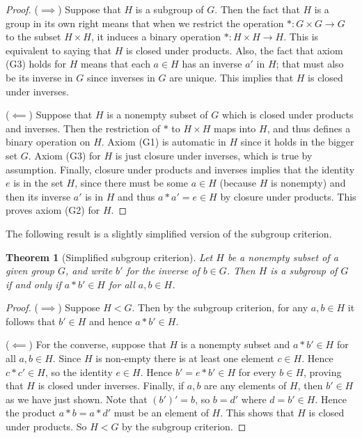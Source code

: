 \documentclass[11pt]{article}
\newtheorem{thm}{Theorem}[section]
\theoremstyle{definition}
\begin{document}
\begin{proof}
  ($\implies$) Suppose that $H$ is a subgroup of $G$. Then the fact
  that $H$ is a group in its own right means that when we restrict the
  operation $*\colon G \times G \to G$ to the subset $H \times H$, it
  induces a binary operation $*\colon H \times H \to H$. This is
  equivalent to saying that $H$ is closed under products. Also, the
  fact that axiom (G3) holds for $H$ means that each $a \in H$ has an
  inverse $a'$ in $H$; that must also be its inverse in $G$ since
  inverses in $G$ are unique.  This implies that $H$ is closed under
  inverses.

  ($\impliedby$) Suppose that $H$ is a nonempty subset of $G$ which is
  closed under products and inverses. Then the restriction of $*$ to
  $H \times H$ maps into $H$, and thus defines a binary operation on
  $H$. Axiom (G1) is automatic in $H$ since it holds in the bigger set
  $G$. Axiom (G3) for $H$ is just closure under inverses, which is
  true by assumption. Finally, closure under products and inverses
  implies that the identity $e$ is in the set $H$, since there must be
  some $a \in H$ (because $H$ is nonempty) and then its inverse $a'$
  is in $H$ and thus $a*a' = e \in H$ by closure under products. This
  proves axiom (G2) for $H$.
\end{proof}

The following result is a slightly simplified version of the subgroup
criterion. 


\begin{thm}[Simplified subgroup criterion]
  Let $H$ be a nonempty subset of a given group $G$, and write $b'$
  for the inverse of $b \in G$.  Then $H$ is a subgroup of $G$ if and
  only if $a*b' \in H$ for all $a,b \in H$.
\end{thm}

\begin{proof} 
($\implies$) Suppose $H<G$. Then by the subgroup criterion, for any
  $a,b \in H$ it follows that $b' \in H$ and hence $a*b' \in H$.

($\impliedby$) For the converse, suppose that $H$ is a nonempty
  subset and $a*b' \in H$ for all $a,b \in H$. Since $H$ is non-empty
  there is at least one element $c \in H$. Hence $c*c' \in H$, so the
  identity $e \in H$.  Hence $b' = e*b' \in H$ for every $b\in H$,
  proving that $H$ is closed under inverses. Finally, if $a,b$ are any
  elements of $H$, then $b'\in H$ as we have just shown. Note that
  $(b')' = b$, so $b = d'$ where $d = b' \in H$. Hence the product
  $a*b = a*d'$ must be an element of $H$. This shows that $H$ is
  closed under products. So $H<G$ by the subgroup criterion.
\end{proof}
\end{document}
